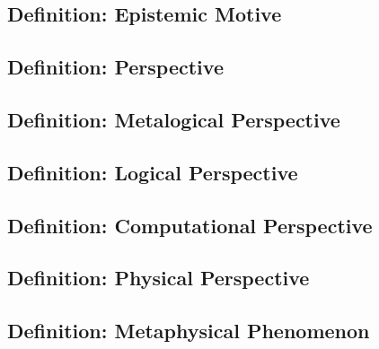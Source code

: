 \documentclass[runningheads]{llncs}
\begin{document}

\subsection{Definition: Epistemic Motive}


\subsection{Definition: Perspective}

\subsection{Definition: Metalogical Perspective}

\subsection{Definition: Logical Perspective}

\subsection{Definition: Computational Perspective}

\subsection{Definition: Physical Perspective}

\subsection{Definition: Metaphysical Phenomenon}
\end{document}
